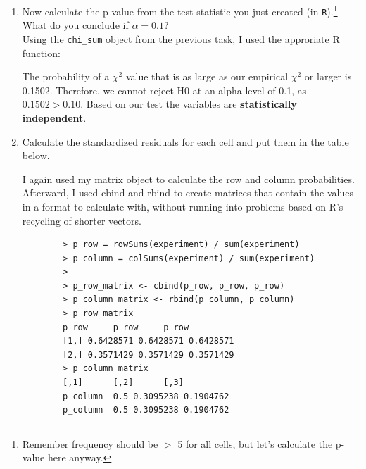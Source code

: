 \documentclass[12pt,letterpaper]{article}
\begin{document}
\begin{enumerate}
	\begin{verbatim}
		    [,1]     [,2]     [,3]
		[1,] 13.5 8.357143 5.142857
		[2,]  7.5 4.642857 2.857143
		> chi_squared <- (experiment - expected_frequency)**2 / expected_frequency
		> chi_squared 
		[,1]      [,2]      [,3]
		[1,] 0.01851852 0.6648352 0.6706349
		[2,] 0.03333333 1.1967033 1.2071429
		> sum(chi_squared) # Chi-squared has a value of 3.791168
		[1] 3.791168
		> chi_sum <- sum(chi_squared)
		> chi_sum
		[1] 3.791168
	\end{verbatim}
	
		
	\item [(b)]
	Now calculate the p-value from the test statistic you just created (in \texttt{R}).\footnote{Remember frequency should be $>$ 5 for all cells, but let's calculate the p-value here anyway.}  What do you conclude if $\alpha = 0.1$?\\
	
	
	Using the \texttt{chi\_sum} object from the previous task, I used the approriate R function:
	
	
	
	The probability of a $\chi^2$ value that is as large as our empirical $\chi^2$ or larger is 0.1502. Therefore, we cannot reject H0 at an alpha level of 0.1, as $0.1502 > 0.10$. Based on our test the variables are \textbf{statistically independent}.
	
	
	\newpage
	\item [(c)] Calculate the standardized residuals for each cell and put them in the table below.
	\vspace{1cm}
	
	I again used my matrix object to calculate the row and column probabilities. Afterward, I used cbind and rbind to create matrices that contain the values in a format to calculate with, without running into problems based on R’s recycling of shorter vectors.
	
	\begin{verbatim}
		> p_row = rowSums(experiment) / sum(experiment)
		> p_column = colSums(experiment) / sum(experiment)
		> 
		> p_row_matrix <- cbind(p_row, p_row, p_row)
		> p_column_matrix <- rbind(p_column, p_column)
		> p_row_matrix
		p_row     p_row     p_row
		[1,] 0.6428571 0.6428571 0.6428571
		[2,] 0.3571429 0.3571429 0.3571429
		> p_column_matrix 
		[,1]      [,2]      [,3]
		p_column  0.5 0.3095238 0.1904762
		p_column  0.5 0.3095238 0.1904762
	\end{verbatim}
	

\end{enumerate}
\end{document}
